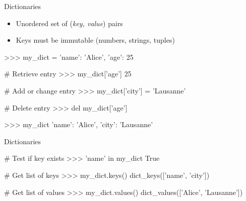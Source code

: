 \documentclass[10pt]{beamer}
\begin{document}
\begin{frame}[fragile]{Dictionaries}

\begin{itemize}
\item  Unordered set of (\emph{key, value}) pairs
\item  Keys must be immutable (numbers, strings, tuples)
\end{itemize}



\begin{pythoncode}
>>> my_dict = {'name': 'Alice', 'age': 25}
\end{pythoncode}



\begin{pythoncode}
# Retrieve entry
>>> my_dict['age']
25
\end{pythoncode}



\begin{pythoncode}
# Add or change entry
>>> my_dict['city'] = 'Lausanne'

# Delete entry
>>> del my_dict['age']
\end{pythoncode}



\begin{pythoncode}
>>> my_dict
{'name': 'Alice', 'city': 'Lausanne'}
\end{pythoncode}

\end{frame}


\begin{frame}[fragile]{Dictionaries}

\begin{pythoncode}
# Test if key exists
>>> 'name' in my_dict
True
\end{pythoncode}



\begin{pythoncode}
# Get list of keys
>>> my_dict.keys()
dict_keys(['name', 'city'])
\end{pythoncode}



\begin{pythoncode}
# Get list of values
>>> my_dict.values()
dict_values(['Alice', 'Lausanne'])
\end{pythoncode}

\end{frame}
\end{document}
